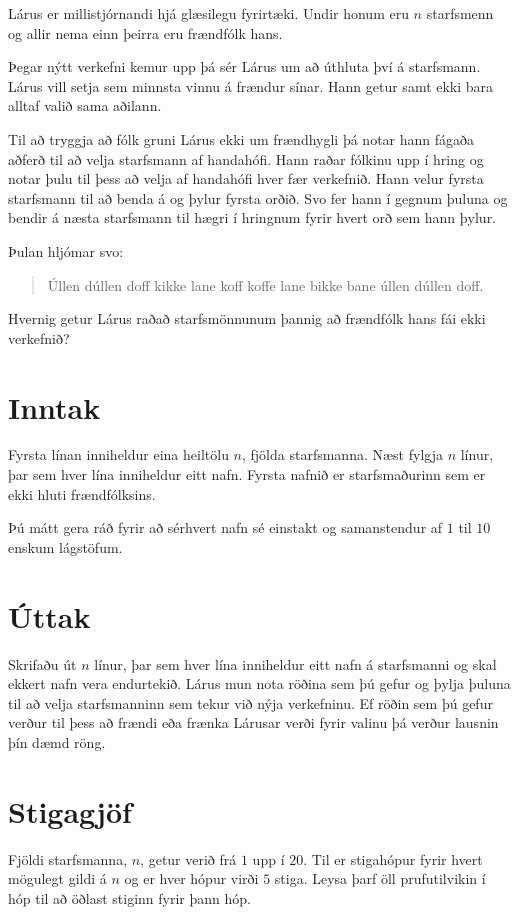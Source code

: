 
Lárus er millistjórnandi hjá glæsilegu fyrirtæki.
Undir honum eru $n$ starfsmenn og allir nema einn þeirra eru frændfólk hans.

Þegar nýtt verkefni kemur upp þá sér Lárus um að úthluta því á starfsmann.
Lárus vill setja sem minnsta vinnu á frændur sínar.
Hann getur samt ekki bara alltaf valið sama aðilann.

Til að tryggja að fólk gruni Lárus ekki um frændhygli þá notar hann fágaða aðferð til að velja starfsmann af handahófi.
Hann raðar fólkinu upp í hring og notar þulu til þess að velja af handahófi hver fær verkefnið.
Hann velur fyrsta starfsmann til að benda á og þylur fyrsta orðið.
Svo fer hann í gegnum þuluna og bendir á næsta starfsmann til hægri í hringnum fyrir hvert orð sem hann þylur.

Þulan hljómar svo:
\begin{quote}
    Úllen dúllen doff kikke lane koff koffe lane bikke bane úllen dúllen doff.
\end{quote}

Hvernig getur Lárus raðað starfsmönnunum þannig að frændfólk hans fái ekki verkefnið?

\section*{Inntak}
Fyrsta línan inniheldur eina heiltölu $n$, fjölda starfsmanna.
Næst fylgja $n$ línur, þar sem hver lína inniheldur eitt nafn.
Fyrsta nafnið er starfsmaðurinn sem er ekki hluti frændfólksins.

Þú mátt gera ráð fyrir að sérhvert nafn sé einstakt og samanstendur af $1$ til $10$ enskum lágstöfum.

\section*{Úttak}
Skrifaðu út $n$ línur, þar sem hver lína inniheldur eitt nafn á starfsmanni og skal ekkert nafn vera endurtekið.
Lárus mun nota röðina sem þú gefur og þylja þuluna til að velja starfsmanninn sem tekur við nýja verkefninu.
Ef röðin sem þú gefur verður til þess að frændi eða frænka Lárusar verði fyrir valinu þá verður lausnin þín dæmd röng.

\section*{Stigagjöf}
Fjöldi starfsmanna, $n$, getur verið frá $1$ upp í $20$.
Til er stigahópur fyrir hvert mögulegt gildi á $n$ og er hver hópur virði $5$ stiga.
Leysa þarf öll prufutilvikin í hóp til að öðlast stiginn fyrir þann hóp.

